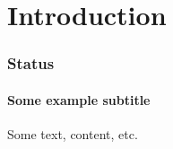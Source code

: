 \section[Introduction]{Introduction}


\begin{frame}
    \frametitle{Status}
    \framesubtitle{Some example subtitle}
    \centering
    Some text, content, etc.
\end{frame}
